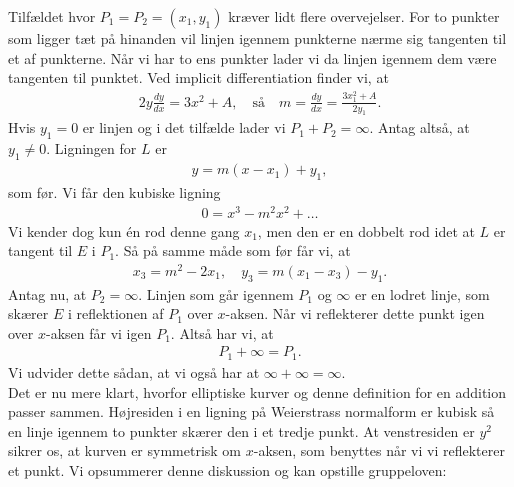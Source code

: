 Tilfældet hvor $P_1 = P_2 = (x_1, y_1)$ kræver lidt flere overvejelser. For to punkter som ligger
tæt på hinanden vil linjen igennem punkterne nærme sig tangenten til et af punkterne. Når vi har to ens punkter lader vi da linjen igennem dem være tangenten til punktet. Ved implicit differentiation finder vi, at 
\begin{align*}
	2y \frac{dy}{dx} = 3x^2 + A, \quad \text{så} \quad m = \frac{dy}{dx} = \frac{3x_{1}^{2} + A}{2y_1}.
\end{align*}
Hvis $y_1 = 0$ er linjen og i det tilfælde lader vi $P_1 + P_2 = \infty$. Antag altså, at $y_1 \neq 0$. Ligningen for $L$ er 
\begin{align*}
	y = m(x-x_1) + y_1,
\end{align*}
som før. Vi får den kubiske ligning
\begin{align*}
	0 = x^3 - m^2 x^2 + \ldots
\end{align*}
Vi kender dog kun én rod denne gang $x_1$, men den er en dobbelt rod idet at $L$ er tangent til $E$ i $P_1$. Så på samme måde som før får vi, at 
\begin{align*}
	x_3 = m^2 - 2x_1, \quad y_3 = m(x_1 - x_3) - y_1.
\end{align*}
Antag nu, at $P_2 = \infty$. Linjen som går igennem $P_1$ og $\infty$ er en lodret linje, som skærer $E$ i reflektionen af $P_1$ over $x$-aksen. Når vi reflekterer dette punkt igen over $x$-aksen får vi igen $P_1$. Altså har vi, at
\begin{align*}
	P_1 + \infty = P_1.
\end{align*}
Vi udvider dette sådan, at vi også har at $\infty + \infty = \infty$. 
\\
Det er nu mere klart, hvorfor elliptiske kurver og denne definition for en addition passer sammen. Højresiden i en ligning på Weierstrass normalform er kubisk så en linje igennem to punkter skærer den i et tredje punkt. At venstresiden er $y^2$ sikrer os, at kurven er symmetrisk om $x$-aksen, som benyttes når vi vi reflekterer et punkt. Vi opsummerer denne diskussion og kan opstille gruppeloven:

